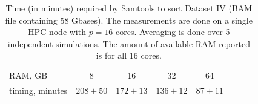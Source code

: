 \documentclass[10pt]{article}
\begin{document}
 \begin{table}[hbtp]
\small

\caption{%
	Time (in minutes) required by Samtools to sort
	Dataset IV (BAM file containing 58 Gbases). The measurements are done on a single HPC
	node with $p=16$ cores. Averaging is done over 5 independent simulations. The
	amount of available RAM reported is for all 16 cores.
}
\begin{center}
\begin{tabular}{|l|c|c|c|c|c|c|c|}
RAM, GB		&	8			&		16			&			32		& 		64				\\
timing, minutes	&	$208\pm50$	&	$172\pm13$		&	$136\pm12$		& 	$87\pm11$			\\
\end{tabular}
\end{center}
\label{table:samtools-sort}
\normalsize
\end{table}%
\end{document}
